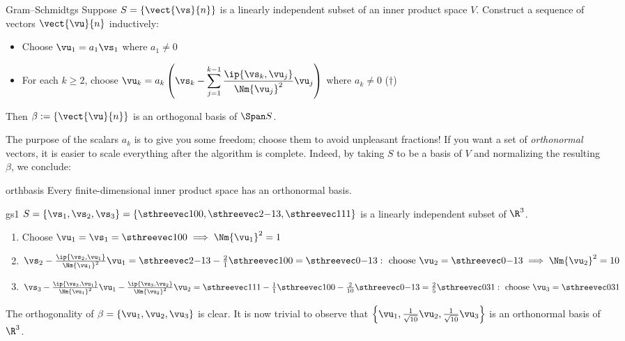 \begin{thm}{Gram--Schmidt}{gs}
Suppose $S=\{\vect{\vs}{n}\}$ is a linearly independent subset of an inner product space $V$. Construct a sequence of vectors $\vect{\vu}{n}$ inductively:
\begin{itemize}
  \item Choose $\vu_1=a_1\vs_1$ where $a_1\neq 0$\vspace{-2pt}
  \item For each $k\ge 2$, choose $\displaystyle\vu_k=a_k\left(\vs_k-\sum_{j=1}^{k-1}\frac{\ip{\vs_k,\vu_j}}{\Nm{\vu_j}^2}\vu_j\right)$ where $a_k\neq 0$ \hfill($\dag$)
\end{itemize}
Then $\beta:=\{\vect{\vu}{n}\}$ is an orthogonal basis of $\Span S$.
\end{thm}

The purpose of the scalars $a_k$ is to give you some freedom; choose them to avoid unpleasant fractions! If you want a set of \emph{orthonormal} vectors, it is easier to scale everything after the algorithm is complete. Indeed, by taking $S$ to be a basis of $V$ and normalizing the resulting $\beta$, we conclude:

\begin{cor}{}{orthbasis}
Every finite-dimensional inner product space has an orthonormal basis.
\end{cor}

\begin{example}{}{gs1}
$S=\{\vs_1,\vs_2,\vs_3\}=\left\{\sthreevec 100,\sthreevec 2{-1}3,\sthreevec 111\right\}$ is a linearly independent subset of $\R^3$.
\begin{enumerate}
  \item Choose $\vu_1=\vs_1=\sthreevec 100\implies \Nm{\vu_1}^2=1$
  \item $\vs_2-\frac{\ip{\vs_2,\vu_1}}{\Nm{\vu_1}^2}\vu_1=\sthreevec 2{-1}3-\frac{2}{1}\sthreevec 100 =\sthreevec 0{-1}3:\text{ choose }\vu_2=\sthreevec 0{-1}3\implies \Nm{\vu_2}^2=10$
  \item $\vs_3-\frac{\ip{\vs_3,\vu_1}}{\Nm{\vu_1}^2}\vu_1 -\frac{\ip{\vs_3,\vu_2}}{\Nm{\vu_2}^2}\vu_2=\sthreevec 111-\frac{1}{1}\sthreevec 100 -\frac{2}{10}\sthreevec 0{-1}3 =\frac 25\sthreevec 0{3}{1}:\text{ choose }\vu_3=\sthreevec 03{1}$
\end{enumerate}
The orthogonality of $\beta=\{\vu_1,\vu_2,\vu_3\}$ is clear. It is now trivial to observe that $\left\{\vu_1,\frac 1{\sqrt{10}}\vu_2,\frac 1{\sqrt{10}}\vu_3\right\}$ is an orthonormal basis of $\R^3$.
\end{example}


